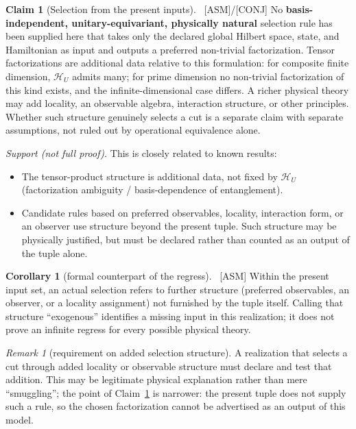 \documentclass[11pt]{article}
\newcommand{\asm}{\textcolor{blue!70!black}{\textsf{\small[ASM]}}}
\newcommand{\conj}{\textcolor{orange!80!black}{\textsf{\small[CONJ]}}}
\newcommand{\post}{\textcolor{purple!70!black}{\textsf{\small[POST]}}}
\newcommand{\gap}{\textcolor{red!75!black}{\textsf{\small[GAP]}}}
\def\conj{[CONJ]}\def\post{[POST]}\def\gap{[GAP]}%
\theoremstyle{definition}
\newtheorem{claim}{Claim}[section]
\newtheorem{corollary}{Corollary}[section]
\theoremstyle{remark}
\newtheorem*{remark}{Remark}
\begin{document}
\begin{claim}[Selection from the present inputs]\label{cl:noselect}{\normalfont\ \asm/\conj}
No \textbf{basis-independent, unitary-equivariant, physically natural} selection rule has been supplied here that takes only the declared global Hilbert space, state, and Hamiltonian as input and outputs a preferred non-trivial factorization. Tensor factorizations are additional data relative to this formulation: for composite finite dimension, $\mathcal{H}_U$ admits many; for prime dimension no non-trivial factorization of this kind exists, and the infinite-dimensional case differs. A richer physical theory may add locality, an observable algebra, interaction structure, or other principles. Whether such structure genuinely selects a cut is a separate claim with separate assumptions, not ruled out by operational equivalence alone.
\end{claim}

\noindent\emph{Support (not full proof).} This is closely related to known results:
\begin{itemize}[leftmargin=1.4em, itemsep=1pt, topsep=2pt]
  \item The tensor-product structure is additional data, not fixed by $\mathcal{H}_U$ (factorization ambiguity / basis-dependence of entanglement).
  \item Candidate rules based on preferred observables, locality, interaction form, or an observer use structure beyond the present tuple. Such structure may be physically justified, but must be declared rather than counted as an output of the tuple alone.
\end{itemize}

\begin{corollary}[formal counterpart of the regress]\label{cor:regress}{\normalfont\ \asm}
Within the present input set, an actual selection refers to further structure (preferred observables, an observer, or a locality assignment) not furnished by the tuple itself. Calling that structure ``exogenous'' identifies a missing input in this realization; it does not prove an infinite regress for every possible physical theory.
\end{corollary}

\begin{remark}[requirement on added selection structure]
A realization that selects a cut through added locality or observable structure must declare and test that addition. This may be legitimate physical explanation rather than mere ``smuggling''; the point of Claim~\ref{cl:noselect} is narrower: the present tuple does not supply such a rule, so the chosen factorization cannot be advertised as an output of this model.
\end{remark}
\end{document}
